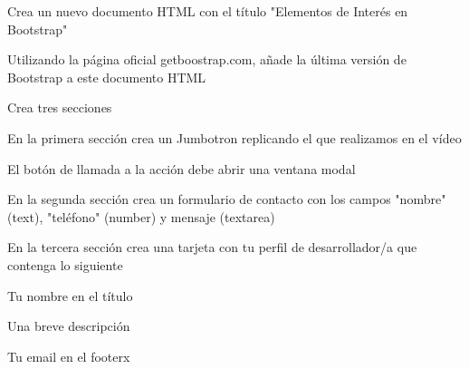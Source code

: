 Crea un nuevo documento HTML con el título "Elementos de Interés en Bootstrap"

Utilizando la página oficial getboostrap.com, añade la última versión de Bootstrap a este documento HTML

Crea tres secciones

En la primera sección crea un Jumbotron replicando el que realizamos en el vídeo

El botón de llamada a la acción debe abrir una ventana modal

En la segunda sección crea un formulario de contacto con los campos "nombre" (text), "teléfono" (number) y mensaje (textarea)

En la tercera sección crea una tarjeta con tu perfil de desarrollador/a que contenga lo siguiente

Tu nombre en el título

Una breve descripción

Tu email en el footerx 